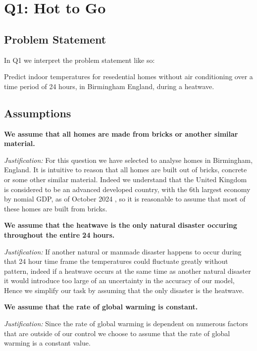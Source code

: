 \documentclass[11pt]{article}
\begin{document}
\newpage
\tableofcontents
\newpage

\section{Q1: Hot to Go}

\subsection{Problem Statement}

In Q1 we interpret the problem statement like so:

Predict indoor temperatures for resedential homes without air conditioning over a time period of
24 hours, in Birmingham England, during a heatwave.

\subsection{Assumptions}

\textbf{\sffamily We assume that all homes are made from bricks or another similar material.}

\textit{Justification:} For this question we have selected to analyse homes in Birmingham, England. It is intuitive
to reason that all homes are built out of bricks, concrete or some other similar material. Indeed we understand that
the United Kingdom is considered to be an advanced developed country, with the 6th largest economy by nomial GDP, as
of October 2024 \cite{imf}, so it is reasonable to assume that most of these homes are built from bricks.

\noindent
\textbf{\sffamily We assume that the heatwave is the only natural disaster occuring throughout the entire 24 hours.}

\textit{Justification:} If another natural or manmade disaster happens to occur during that 24 hour time frame the temperatures
could fluctuate greatly without pattern, indeed if a heatwave occurs at the same time as another natural disaster it
would introduce too large of an uncertainty in the accuracy of our model, Hence we simplify our task by assuming
that the only disaster is the heatwave.

\noindent
\textbf{\sffamily We assume that the rate of global warming is constant.}

\textit{Justification:} Since the rate of global warming is dependent on numerous factors that are outside of our control we
choose to assume that the rate of global warming is a constant value.
\end{document}

